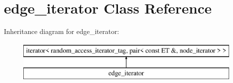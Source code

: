 \hypertarget{classedge__iterator}{\section{edge\+\_\+iterator Class Reference}
\label{classedge__iterator}
}
Inheritance diagram for edge\+\_\+iterator\+:\begin{figure}[H]
\begin{center}
\leavevmode
\includegraphics[height=2.000000cm]{classedge__iterator}
\end{center}
\end{figure}

